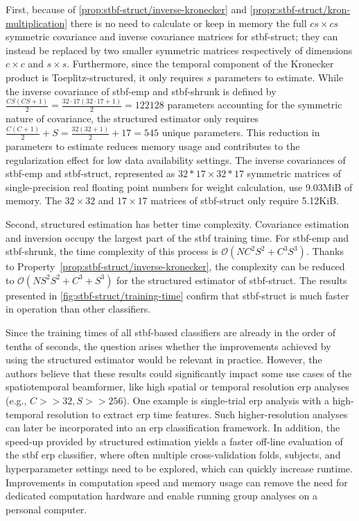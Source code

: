 	First, because of \cref{prop:stbf-struct/inverse-kronecker} and
	\cref{propr:stbf-struct/kron-multiplication} there is no need to calculate or keep in memory the full $cs\times cs$
	symmetric covariance and inverse covariance matrices for \ac{stbf-struct}; they can instead be replaced by two smaller symmetric matrices respectively of dimensions $c\times c$ and $s\times s$.
	Furthermore, since the temporal component of the Kronecker product is
	Toeplitz-structured, it only requires $s$ parameters to
	estimate.
	While the inverse covariance of \ac{stbf-emp} and \ac{stbf-shrunk} is
	defined by $\frac{CS(CS+1)}{2}=\frac{32\cdot17(32\cdot17+1)}{2}=\num{122128}$
	parameters accounting for the symmetric nature of
	covariance, the structured estimator only requires $\frac{C(C+1)}{2} + S =
		\frac{32(32+1)}{2} + 17=545$ unique parameters.
	This reduction in parameters to estimate reduces memory usage and contributes to the regularization effect for low data availability settings.
	The inverse covariances of \ac{stbf-emp} and
	\ac{stbf-struct}, represented as $32*17\times 32*17$ symmetric matrices of
	single-precision real floating point numbers for weight calculation,
	use 9.03MiB of memory.
	The $32\times 32$ and $17\times 17$ matrices of \ac{stbf-struct} only
	require 5.12KiB.

	Second, structured estimation has better time complexity.
	Covariance estimation and inversion occupy the largest part of the \ac{stbf} training time.
	For \ac{stbf-emp} and \ac{stbf-shrunk}, the time complexity of this process is $\mathcal{O}(NC^2S^2+C^3S^3)$.
	Thanks to Property~\ref{prop:stbf-struct/inverse-kronecker}, the complexity can be reduced to
	$\mathcal{O}(NS^2S^2+C^3+S^3)$ for the structured estimator of \ac{stbf-struct}.
	The results presented in \cref{fig:stbf-struct/training-time} confirm that
  \ac{stbf-struct} is much faster in operation than other classifiers.

	Since the training times of all \ac{stbf}-based classifiers are already in
	the order of tenths of seconds, the question arises whether the
	improvements achieved by using the structured estimator would be relevant in
	practice.
	However, the authors believe that these results could significantly impact some
	use cases of the spatiotemporal beamformer, like high spatial or temporal
  resolution \ac{erp} analyses (e.g., $C>>32, S>>256$).
	One example is single-trial \ac{erp} analysis with a high-temporal
	resolution to extract \ac{erp} time features.
	Such higher-resolution analyses can later be incorporated into an \ac{erp}
	classification framework.
	In addition, the speed-up provided by structured estimation yields a faster
	off-line evaluation of the \ac{stbf} \ac{erp} classifier, where often multiple cross-validation folds, subjects, and hyperparameter settings need to be explored, which can quickly increase runtime.
	Improvements in computation speed and memory usage can remove the need for dedicated computation hardware and enable running group analyses on a personal computer.

